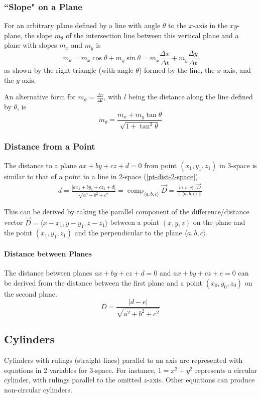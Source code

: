 \documentclass{article}
\DeclareMathOperator{\comp}{comp}
\newcommand{\vect}[1]{\ensuremath{\overrightarrow{#1}}}
\newcommand{\magnitude}[1]{\ensuremath{\lVert #1 \rVert}}
\newcommand{\abs}[1]{\left|#1\right|}
\begin{document}
\subsubsection{``Slope" on a Plane}
For an arbitrary plane defined by a line with angle $\theta$ to the $x$-axis in the $xy$-plane, the slope $m_\theta$ of the intersection line between this vertical plane and a plane with slopes $m_x$ and $m_y$ is
$$m_\theta = m_x\cos{\theta} + m_y\sin{\theta}= m_x\frac{\Delta x}{\Delta t} + m_y\frac{\Delta y}{\Delta t}$$ as shown by the right triangle (with angle $\theta$) formed by the line, the $x$-axis, and the $y$-axis.

An alternative form for $m_\theta=\frac{\Delta z}{\Delta l}$, with $l$ being the distance along the line defined by $\theta$, is $$m_\theta = \frac{m_x+m_y\tan{\theta}}{\sqrt{1+\tan^2{\theta}}}$$

\subsubsection{Distance from a Point}
The distance to a plane $ax+by+cz+d=0$ from point $(x_1, y_1, z_1)$ in 3-space is similar to that of a point to a line in 2-space (\ref{pt-dist-2-space}).
\begin{align*}
d=\frac{\abs{ax_1+by_1+cz_1+d}}{\sqrt{a^2+b^2+c^2}} =
\comp_{\langle a, b, c \rangle} \vect{D} = \frac{\langle a, b, c \rangle \cdot \vect{D}}{\magnitude{\langle a, b, c \rangle}}
\end{align*}

This can be derived by taking the parallel component of the difference/distance vector $\vect{D} = \langle x-x_1, y-y_1, z-z_1\rangle$ between a point $(x,y,z)$ on the plane and the point $(x_1, y_1, z_1)$ and the perpendicular to the plane $\langle a, b, c \rangle$.

\paragraph{Distance between Planes}
The distance between planes $ax + by + cz + d = 0$ and $ax + by + cz + e = 0$ can be derived from the distance between the first plane and a point $(x_0, y_0, z_0)$ on the second plane.
\[
D=\frac{\abs{d-e}}{\sqrt{a^2+b^2+c^2}}
\]

\subsection{Cylinders}
Cylinders with rulings (straight lines) parallel to an axis are represented with equations in 2 variables for 3-space.
For instance, $1 = x^2 + y^2$ represents a circular cylinder, with rulings parallel to the omitted $z$-axis.
Other equations can produce non-circular cylinders.
\end{document}
